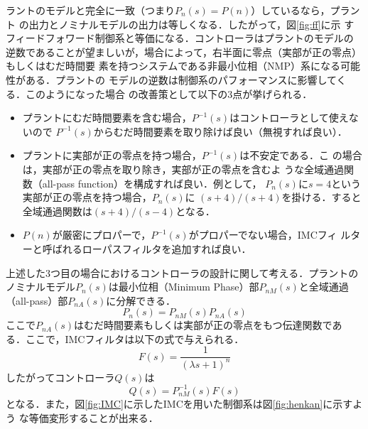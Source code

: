 \documentclass[a4paper,12pt]{jarticle}
\begin{document}
ラントのモデルと完全に一致（つまり$P_n(s)=P(n)$）しているなら，プラント
の出力とノミナルモデルの出力は等しくなる．したがって，図\ref{fig:ff}に示
すフィードフォワード制御系と等価になる．コントローラはプラントのモデルの
逆数であることが望ましいが，場合によって，右半面に零点（実部が正の零点）もしくはむだ時間要
素を持つシステムである非最小位相（NMP）系になる可能性がある．プラントの
モデルの逆数は制御系のパフォーマンスに影響してくる．このようになった場合
の改善策として以下の3点が挙げられる．
%
\begin{itemize}
 \item プラントにむだ時間要素を含む場合，$P^{-1}(s)$はコントローラとして使えないので
	   $P^{-1}(s)$からむだ時間要素を取り除けば良い（無視すれば良い）．
	   
 \item プラントに実部が正の零点を持つ場合，$P^{-1}(s)$は不安定である．こ
	   の場合は，実部が正の零点を取り除き，実部が正の零点を含むよ
	   うな全域通過関数（all-pass function）を構成すれば良い．例として，
	   $P_n(s)$に$s=4$という実部が正の零点を持つ場合，$P_n(s)$に
	   $(s+4)/(s+4)$を掛ける．すると全域通過関数は$(s+4)/(s-4)$となる．
	   
 \item $P(n)$が厳密にプロパーで，$P^{-1}(s)$がプロパーでない場合，IMCフィ
	   ルターと呼ばれるローパスフィルタを追加すれば良い．
\end{itemize}
%
上述した3つ目の場合におけるコントローラの設計に関して考える．プラントの
ノミナルモデル$P_n(s)$は最小位相（Minimum Phase）部$P_{nM}(s)$と全域通過
（all-pass）部$P_{nA}(s)$に分解できる．
%
\begin{equation}
 P_n(s)=P_{nM}(s)P_{nA}(s)
\end{equation}
%
ここで$P_{nA}(s)$はむだ時間要素もしくは実部が正の零点をもつ伝達関数であ
る．ここで，IMCフィルタは以下の式で与えられる．
%
\begin{equation}\label{equ:imc_f}
 F(s) = \frac{1}{(\lambda s + 1)^n}
\end{equation}
%
したがってコントローラ$Q(s)$は
%
\begin{equation}\label{equ:imc_c}
 Q(s) = P_{nM}^{-1}(s)F(s)
\end{equation}
%
となる．また，図\ref{fig:IMC}に示したIMCを用いた制御系は図\ref{fig:henkan}に示すよう
な等価変形することが出来る．
%
\end{document}
